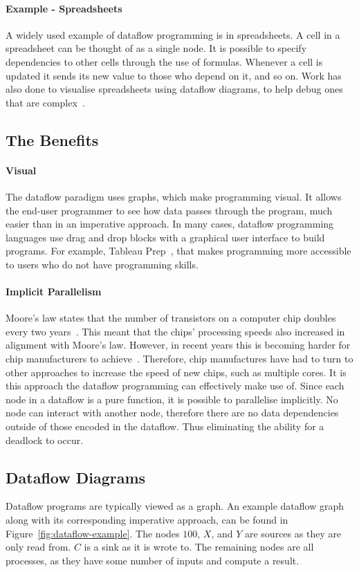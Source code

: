 \documentclass[dissertation.tex]{subfiles}
\begin{document}
\paragraph{Example - Spreadsheets}
A widely used example of dataflow programming is in spreadsheets.
A cell in a spreadsheet can be thought of as a single node.
It is possible to specify dependencies to other cells through the use of formulas.
Whenever a cell is updated it sends its new value to those who depend on it, and so on.
Work has also done to visualise spreadsheets using dataflow diagrams, to help debug ones that are complex~\cite{hermans2011breviz}.


\subsection{The Benefits}
\paragraph{Visual}
The dataflow paradigm uses graphs, which make programming visual.
It allows the end-user programmer to see how data passes through the program, much easier than in an imperative approach.
In many cases, dataflow programming languages use drag and drop blocks with a graphical user interface to build programs.
For example, Tableau Prep~\cite{tableauPrep}, that makes programming more accessible to users who do not have programming skills.

\paragraph{Implicit Parallelism}
Moore's law states that the number of transistors on a computer chip doubles every two years~\cite{4785860}.
This meant that the chips' processing speeds also increased in alignment with Moore's law.
However, in recent years this is becoming harder for chip manufacturers to achieve~\cite{bentley_2020}.
Therefore, chip manufactures have had to turn to other approaches to increase the speed of new chips, such as multiple cores.
It is this approach the dataflow programming can effectively make use of.
Since each node in a dataflow is a pure function, it is possible to parallelise implicitly.
No node can interact with another node, therefore there are no data dependencies outside of those encoded in the dataflow.
Thus eliminating the ability for a deadlock to occur.

\subsection{Dataflow Diagrams}
Dataflow programs are typically viewed as a graph.
An example dataflow graph along with its corresponding imperative approach, can be found in Figure~\ref{fig:dataflow-example}.
The nodes $100$, $X$, and $Y$ are sources as they are only read from. $C$ is a sink as it is wrote to.
The remaining nodes are all processes, as they have some number of inputs and compute a result.
\end{document}
